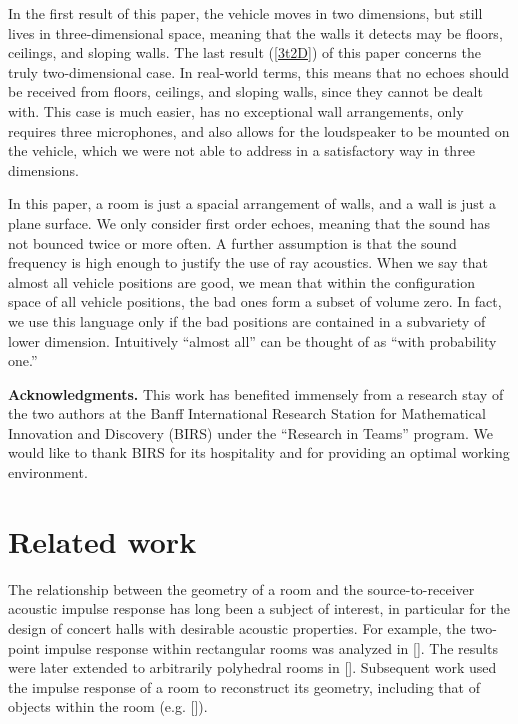 \documentclass[reqno]{amsart}
\begin{document}
In the first result of this paper, the vehicle moves in two dimensions, but still lives in three-dimensional space, meaning that the walls it detects may be floors, ceilings, and sloping walls. The last result (\cref{3t2D}) of this paper concerns the truly two-dimensional case. In real-world terms, this means that no echoes should be received from floors, ceilings, and sloping walls, since they cannot be dealt with. This case is much easier, has no exceptional wall arrangements, only requires three microphones, and also allows for the loudspeaker to be mounted on the vehicle, which we were not able to address in a satisfactory way in three dimensions.

In this paper, a room is just a spacial arrangement of walls, and a wall is just a plane surface. We only consider first order echoes, meaning that the sound has not bounced twice or more often. A further assumption is that the sound frequency is high enough to justify the use of ray acoustics. When we say that almost all vehicle positions are good, we mean that within the configuration space of all vehicle positions, the bad ones form a subset of volume zero. In fact, we use this language only if the bad positions are contained in a subvariety of lower dimension. Intuitively ``almost all'' can be thought of as ``with probability one.''

\par{\bf Acknowledgments.} This work has benefited immensely from a research stay of the two authors at the Banff International Research Station for Mathematical Innovation and Discovery (BIRS) under the ``Research in Teams'' program. We would like to thank BIRS for its hospitality and for providing an optimal working environment.


\section{Related work}
The relationship between the geometry of a room and the source-to-receiver acoustic impulse response has long been a subject of interest, in particular for the design of concert halls with desirable acoustic properties. For example, the two-point impulse response within rectangular rooms was analyzed in []. The results were later extended to arbitrarily polyhedral rooms  in []. Subsequent work used the impulse response of a room to reconstruct its geometry, including that of objects within the room (e.g. []). 
\end{document}
